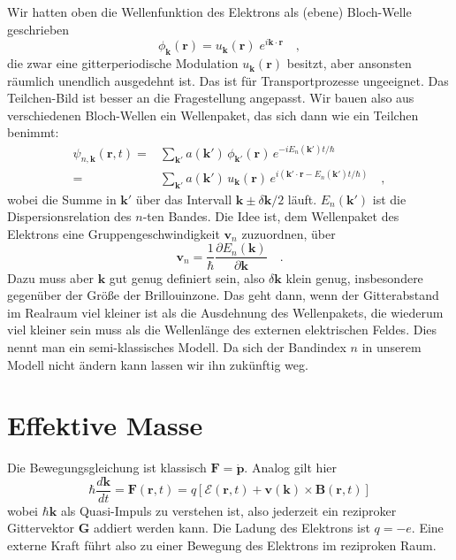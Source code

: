 Wir hatten oben die Wellenfunktion des Elektrons als (ebene) Bloch-Welle geschrieben
\begin{equation}
   \phi_\mathbf{k}(\mathbf{r}) =  u_\mathbf{k}(\mathbf{r}) \; e^{i \mathbf{k} \cdot \mathbf{r} } \quad ,
\end{equation}
die zwar eine gitterperiodische Modulation $u_\mathbf{k}(\mathbf{r})$ besitzt, aber ansonsten räumlich unendlich ausgedehnt ist. Das ist für Transportprozesse ungeeignet. Das Teilchen-Bild ist besser an die Fragestellung angepasst. Wir bauen also aus verschiedenen Bloch-Wellen ein Wellenpaket, das sich dann wie ein Teilchen benimmt:
\begin{eqnarray}
   \psi_{n, \mathbf{k}}(\mathbf{r},t) =  & \sum_{\mathbf{k}'}  a(\mathbf{k}') \, \phi_\mathbf{k'}(\mathbf{r}) \, e^{-i E_n(\mathbf{k}') t / \hbar} \\
   = & \sum_{\mathbf{k}'}  a(\mathbf{k}') \,  u_\mathbf{k}(\mathbf{r}) \, e^{i (\mathbf{k}' \cdot \mathbf{r}  - E_n(\mathbf{k}') t / \hbar )} \quad ,
\end{eqnarray}
wobei die Summe in $\mathbf{k}'$ über das Intervall $\mathbf{k} \pm \delta \mathbf{k} / 2$ läuft. $E_n(\mathbf{k}')$ ist die Dispersionsrelation des $n$-ten Bandes.
Die Idee ist, dem Wellenpaket des Elektrons eine Gruppengeschwindigkeit $\mathbf{v}_n$ zuzuordnen, über
\begin{equation}
   \mathbf{v}_n = \frac{1}{\hbar} \frac{\partial E_n(\mathbf{k})}{\partial \mathbf{k}} \quad . \label{eq:3_v_gruppe}
\end{equation}
Dazu muss aber $\mathbf{k}$ gut genug definiert sein, also $\delta \mathbf{k}$ klein genug, insbesondere gegenüber der Größe der Brillouinzone. Das geht dann, wenn der Gitterabstand im Realraum viel kleiner ist als die Ausdehnung des Wellenpakets, die wiederum viel kleiner sein muss als die Wellenlänge des externen elektrischen Feldes. Dies nennt man ein semi-klassisches Modell. Da sich der Bandindex $n$ in unserem Modell nicht ändern kann lassen wir ihn zukünftig weg.


\section{Effektive Masse}

Die Bewegungsgleichung ist klassisch $\mathbf{F} = \dot{\mathbf{p}}$. Analog gilt hier
\begin{equation}
   \hbar \frac{d \mathbf{k}}{dt} = \mathbf{F}(\mathbf{r}, t) = q \left[ \bm{\mathcal{E}}(\mathbf{r}, t) +   \mathbf{v}(\mathbf{k}) \times \mathbf{B}(\mathbf{r}, t)\right]
   \label{eq:2_Bewegungsgleichung}
\end{equation}
wobei $\hbar \mathbf{k}$ als Quasi-Impuls zu verstehen ist, also jederzeit ein reziproker Gittervektor $\mathbf{G}$ addiert werden kann. Die Ladung des Elektrons ist $q = -e$.
Eine externe Kraft führt also zu einer Bewegung des Elektrons im reziproken Raum.



